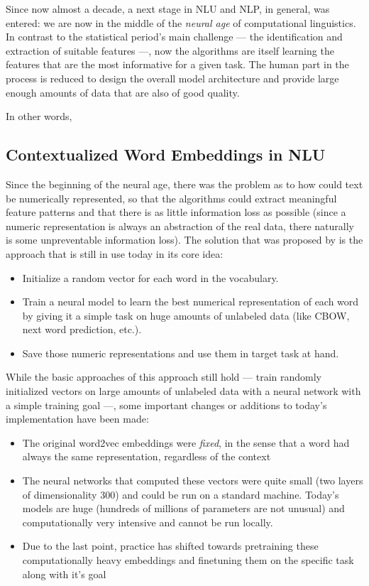 Since now almost a decade, a next stage in NLU and NLP, in general, was entered: we are now in the
middle of the \emph{neural age} of computational linguistics. In contrast to the statistical period's main
challenge --- the identification and extraction of suitable features ---, now the algorithms are
itself learning the features that are the most informative for a given task. The human part in the
process is reduced to design the overall model architecture and provide large enough amounts of data that
are also of good quality.

In other words,


\subsection{Contextualized Word Embeddings in NLU}

Since the beginning of the neural age, there was the problem as to how could text be numerically
represented, so that the algorithms could extract meaningful feature patterns and
that there is as little information loss as possible (since a numeric representation is always
an abstraction of the real data, there naturally is some unpreventable information loss).
The solution that was proposed by \cite{mikolov2013distributed} is the approach that is still
in use today in its core idea:

\begin{itemize}
  \item Initialize a random vector for each word in the vocabulary.
  \item Train a neural model to learn the best numerical representation of each word
    by giving it a simple task on huge amounts of unlabeled data (like CBOW, next word
    prediction, etc.).
  \item Save those numeric representations and use them in target task at hand.
\end{itemize}

While the basic approaches of this approach still hold --- train randomly initialized vectors on
large amounts of unlabeled data with a neural network with a simple training goal ---, some important
changes or additions to today's implementation have been made:

\begin{itemize}
  \item The original word2vec embeddings were \emph{fixed}, in the sense that a word had always
    the same representation, regardless of the context
  \item The neural networks that computed these vectors were quite small (two layers of dimensionality
    300) and could be run on a standard machine.
    Today's models are huge (hundreds of millions of parameters are not unusual) and computationally
    very intensive and cannot be run locally.
  \item Due to the last point, practice has shifted towards pretraining these computationally heavy
    embeddings and finetuning them on the specific task along with it's goal
\end{itemize}

